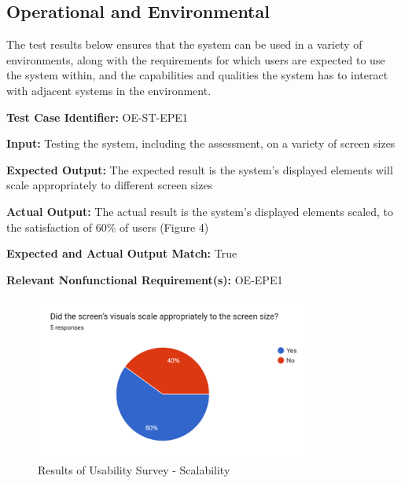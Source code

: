 \documentclass[12pt, titlepage]{article}
\begin{document}
\newpage{}

\subsection{Operational and Environmental}
\hspace{2em}The test results below ensures that the system can be used in a variety of environments,
along with the requirements for which users are expected to use the system within, and the
capabilities and qualities the system has to interact with adjacent systems in the environment.

\begin{mdframed}[linewidth=0.5mm] \par
  \textbf{Test Case Identifier:} OE-ST-EPE1 \par
  \textbf{Input:} Testing the system, including the assessment, on a variety of screen sizes \par
  \textbf{Expected Output:} The expected result is the system's displayed elements will scale appropriately to different screen sizes \par
  \textbf{Actual Output:} The actual result is the system's displayed elements scaled, to the satisfaction of 60\% of users (Figure 4)\par
  \textbf{Expected and Actual Output Match:} True \par
  \textbf{Relevant Nonfunctional Requirement(s):} OE-EPE1
\end{mdframed}

\begin{figure}[h]
  \centering
  \includegraphics[width=0.8\textwidth]{images/UsabilityTestResults2.png}
  \caption{Results of Usability Survey - Scalability}
\end{figure}
\end{document}
